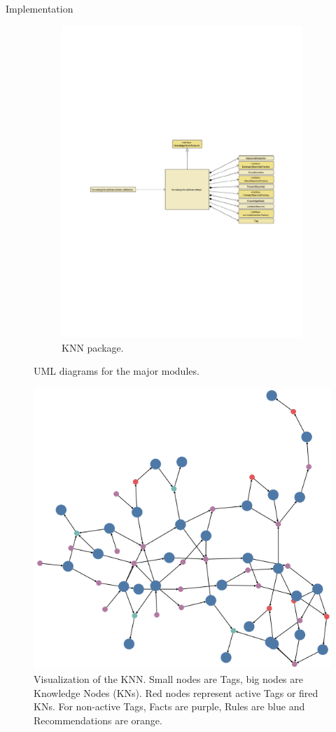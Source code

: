 \documentclass[final]{beamer} %
\begin{document}
\begin{columns}
\begin{column}{.35\textwidth}
\begin{block}{Implementation}
\begin{figure}[!htb]
\begin{subfigure}[!htb]{0.4\columnwidth}
				\includegraphics[width=\columnwidth]{figures/knn_uml.pdf}
				\caption
				{KNN package.}
			\end{subfigure}
			\caption{UML diagrams for the major modules.}
		\end{figure}
	
	
		\begin{figure}[!htb]
			\centering
			\includegraphics[width=.3\columnwidth]{figures/knn_graph.png}
			\caption{Visualization of the KNN. Small nodes are Tags, big nodes are Knowledge Nodes (KNs). Red nodes represent active Tags or fired KNs. For non-active Tags, Facts are purple, Rules are blue and Recommendations are orange.}
		\end{figure}
	

\end{block}
\end{column}
\end{columns}
\end{document}
